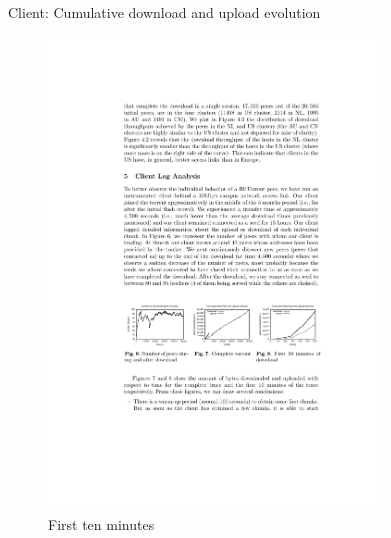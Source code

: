 \begin{frame}{Client: Cumulative download and upload evolution}
	
\begin{figure}	
	\includegraphics[width=0.79\textwidth]{figs/10/bt-fig4}
	\caption{First ten minutes}
\end{figure}	
	
\end{frame}

